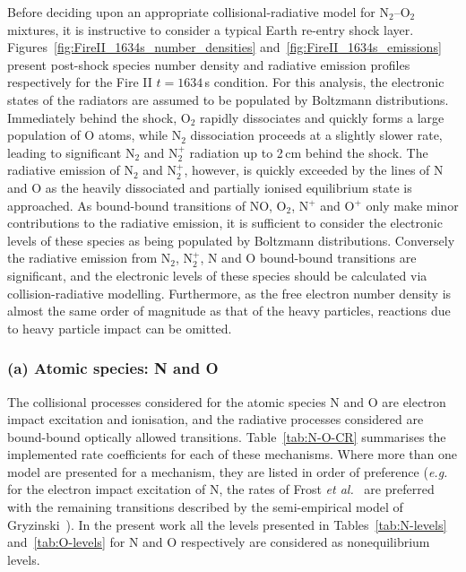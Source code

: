 {Before deciding upon an appropriate collisional-radiative model for N$_2$--O$_2$ mixtures, it is instructive to consider a typical Earth re-entry shock layer.
Figures~\ref{fig:FireII_1634s_number_densities} and~\ref{fig:FireII_1634s_emissions} present post-shock species number density and radiative emission profiles respectively for the Fire II $t=1634$\,s condition.
For this analysis, the electronic states of the radiators are assumed to be populated by Boltzmann distributions.
Immediately behind the shock, O$_2$ rapidly dissociates and quickly forms a large population of O atoms, while N$_2$ dissociation proceeds at a slightly slower rate, leading to significant N$_2$ and N$_2^+$ radiation up to 2\,cm behind the shock.
The radiative emission of N$_2$ and N$_2^+$, however, is quickly exceeded by the lines of N and O as the heavily dissociated and partially ionised equilibrium state is approached.
As bound-bound transitions of NO, O$_2$, N$^+$ and O$^+$ only make minor contributions to the radiative emission, it is sufficient to consider the electronic levels of these species as being populated by Boltzmann distributions.
Conversely the radiative emission from N$_2$, N$_2^+$, N and O bound-bound transitions are significant, and the electronic levels of these species should be calculated via collision-radiative modelling.
Furthermore, as the free electron number density is almost the same order of magnitude as that of the heavy particles, reactions due to heavy particle impact can be omitted.



\subsubsection{(a) Atomic species: N and O}

The collisional processes considered for the atomic species N and O are electron impact excitation and ionisation, and the radiative processes considered are bound-bound optically allowed transitions.
Table~\ref{tab:N-O-CR} summarises the implemented rate coefficients for each of these mechanisms.
Where more than one model are presented for a mechanism, they are listed in order of preference (\textit{e.g.} for the electron impact excitation of N, the rates of Frost \textit{et al.}~\cite{FAS+1998} are preferred with the remaining transitions described by the semi-empirical model of Gryzinski~\cite{Gryz59}).
In the present work all the levels presented in Tables~\ref{tab:N-levels} and~\ref{tab:O-levels} for N and O respectively are considered as nonequilibrium levels.
\par

}
